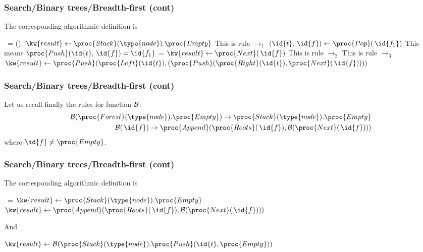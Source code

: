 %
\begin{frame}
\frametitle{Search/Binary trees/Breadth-first (cont)}

The corresponding algorithmic definition is
{\small
\begin{codebox}
\zi	\If \, = ().
\zi	\Then \(\kw{result} \gets
                \proc{Stack}(\type{node}).\proc{Empty}\) 
                \RComment This is rule \(\rightarrow_1\)
\zi	\Else \((\id{t}, \,\id{f}) \gets \proc{Pop} (\,\id{f_1})\)
              \RComment This means \(\proc{Push} (\id{t}, \,\id{f}) =
              \id{f_1}\)
\zi		\If {} = 
\zi		\Then \(\kw{result} \gets \proc{Next} (\,\id{f})\)
                      \RComment This is rule \(\rightarrow_2\)
\zi		\Else \RComment This is rule \(\rightarrow_3\)
\zi		\(\kw{result} \gets \proc{Push} (\proc{Left}
                  (\id{t}), (\proc{Push} (\proc{Right} (\id{t}),
                   \proc{Next} (\,\id{f}))))\)
\zi		\End
\zi	\End
\end{codebox}
}

\end{frame}

%
\begin{frame}
\frametitle{Search/Binary trees/Breadth-first (cont)}

Let us recall finally the rules for function \({\cal B}\):
\begin{eqnarray*}
  {\cal B} (\proc{Forest}(\type{node}).\proc{Empty})
\rightarrow
\proc{Stack}(\type{node}).\proc{Empty}\\
  {\cal B} (\,\id{f})
\rightarrow \proc{Append} (\proc{Roots} (\,\id{f}), {\cal B}
  (\proc{Next} (\,\id{f})))
\end{eqnarray*}
where \(\id{f} \neq \proc{Empty}\).

\end{frame}

%
\begin{frame}
\frametitle{Search/Binary trees/Breadth-first (cont)}

The corresponding algorithmic definition is
\begin{codebox}
\zi	\If \, = 
\zi	\Then \(\kw{result} \gets \proc{Stack}(\type{node}).\proc{Empty}\) 
\zi	\Else \(\kw{result} \gets \proc{Append} (\proc{Roots}
(\,\id{f}), {\cal B} (\proc{Next} (\,\id{f})))\)
\zi	\End
\end{codebox}
And
\begin{codebox}
\(\kw{result} \gets {\cal B}
     (\proc{Stack}(\type{node}).\proc{Push} (\id{t}, \proc{Empty}))\)
\end{codebox}

\end{frame}

